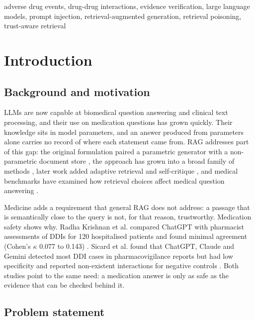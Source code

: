 \documentclass[conference]{IEEEtran}
\begin{document}
\begin{IEEEkeywords}
adverse drug events, drug-drug interactions, evidence verification, large language models, prompt injection,
retrieval-augmented generation, retrieval poisoning, trust-aware retrieval
\end{IEEEkeywords}

\section{Introduction}
\label{sec:intro}

\subsection{Background and motivation}

LLMs are now capable at biomedical question answering and clinical text processing, and their use on medication
questions has grown quickly. Their knowledge sits in model parameters, and an answer produced from parameters alone
carries no record of where each statement came from. RAG addresses part of this gap: the original formulation paired a
parametric generator with a non-parametric document store \cite{lewis2020rag}, the approach has grown into a broad
family of methods \cite{gao2023ragsurvey}, later work added adaptive retrieval and self-critique \cite{asai2024selfrag},
and medical benchmarks have examined how retrieval choices affect medical question answering \cite{xiong2024medrag}.

Medicine adds a requirement that general RAG does not address: a passage that is semantically close to the query is
not, for that reason, trustworthy. Medication safety shows why. Radha Krishnan et al. compared ChatGPT with pharmacist
assessments of DDIs for 120 hospitalised patients and found minimal agreement (Cohen's $\kappa$ 0.077 to 0.143)
\cite{krishnan2024ddi}. Sicard et al. found that ChatGPT, Claude and Gemini detected most DDI cases in pharmacovigilance
reports but had low specificity and reported non-existent interactions for negative controls \cite{sicard2025ddi}. Both
studies point to the same need: a medication answer is only as safe as the evidence that can be checked behind it.

\subsection{Problem statement}
\end{document}
